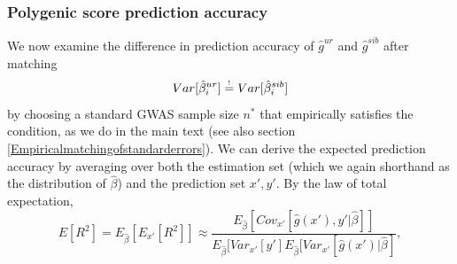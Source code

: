 \documentclass[hidelinks, 12pt]{article}
\begin{document}
\subsubsection{Polygenic score prediction accuracy}
We now examine the difference in prediction accuracy of $\hat{g}^{ur}$ and $\hat{g}^{sib}$ after matching 
\begin{equation}
\label{matching_errors_indirect}
Var[\hat{\beta}_i^{ur}] \reqeq Var[\hat{\beta}_i^{sib}]
\end{equation}
by choosing a standard GWAS sample size $n^*$ that empirically satisfies the condition, as we do in the main text (see also section \ref{Empiricalmatchingofstandarderrors}).  
We can derive the expected prediction accuracy by averaging over both the estimation set (which we again shorthand as the distribution of $\hat{\beta}$) and the prediction set ${x',y'}$.  By the law of total expectation,
\begin{equation}
\label{total_expectation_for_R2}
E[R^2] = E_{\hat{\beta}}[E_{x'}[R^2]] \approx 
\frac{E_{\hat{\beta}}[Cov_{x'}[\hat{g}(x'),y'|\hat{\beta}]]}{E_{\hat{\beta}}[Var_{x'}[y']E_{\hat{\beta}}[Var_{x'}[\hat{g}(x')|\hat{\beta}]},
\end{equation}
\end{document}

